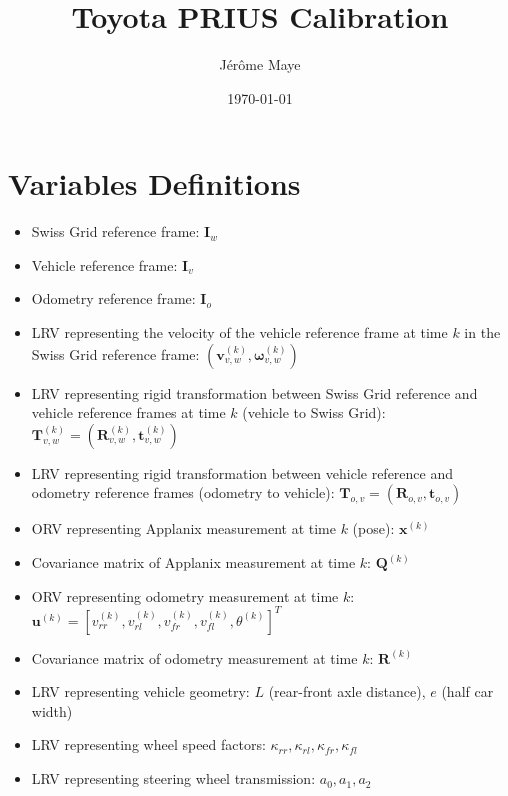 \documentclass[12pt]{article}
\title{Toyota PRIUS Calibration}
\author{J\'{e}r\^{o}me Maye}
\date{\today}
\begin{document}
  \maketitle

  \section{Variables Definitions}\label{sec:model}
    \begin{itemize}
      \item Swiss Grid reference frame: $\mathbf{I}_w$
      \item Vehicle reference frame: $\mathbf{I}_v$
      \item Odometry reference frame: $\mathbf{I}_o$
      \item LRV representing the velocity of the vehicle reference frame at time
        $k$ in the Swiss Grid reference frame:
        $(\mathbf{v}_{v,w}^{(k)},\boldsymbol{\omega}_{v,w}^{(k)})$
      \item LRV representing rigid transformation between Swiss Grid reference
        and vehicle reference frames at time $k$ (vehicle to Swiss Grid):
        $\mathbf{T}_{v,w}^{(k)}=(\mathbf{R}_{v,w}^{(k)},\mathbf{t}_{v,w}^{(k)})$
      \item LRV representing rigid transformation between vehicle reference and
        odometry reference frames (odometry to vehicle):
        $\mathbf{T}_{o,v}=(\mathbf{R}_{o,v},\mathbf{t}_{o,v})$
      \item ORV representing Applanix measurement at time $k$
        (pose): $\mathbf{x}^{(k)}$
      \item Covariance matrix of Applanix measurement at time $k$:
        $\mathbf{Q}^{(k)}$
      \item ORV representing odometry measurement at time $k$:
        $\mathbf{u}^{(k)}=[v_{rr}^{(k)},v_{rl}^{(k)},v_{fr}^{(k)},v_{fl}^{(k)},
        \theta^{(k)}]^T$
      \item Covariance matrix of odometry measurement at time $k$:
        $\mathbf{R}^{(k)}$
      \item LRV representing vehicle geometry: $L$ (rear-front axle distance),
        $e$ (half car width)
      \item LRV representing wheel speed factors: $\kappa_{rr},\kappa_{rl},
        \kappa_{fr},\kappa_{fl}$
      \item LRV representing steering wheel transmission: $a_0,a_1,a_2$
    \end{itemize}
\end{document}
